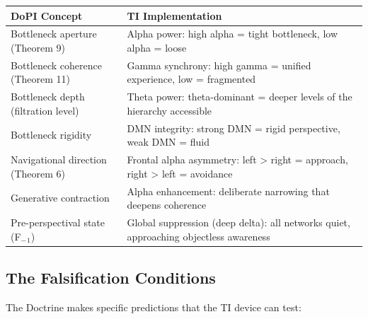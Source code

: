 \begin{longtable}{p{} p{}}
\toprule
\textbf{DoPI Concept} & \textbf{TI Implementation} \\
\midrule
\endhead
Bottleneck aperture (Theorem 9) & Alpha power: high alpha = tight bottleneck, low alpha = loose \\
Bottleneck coherence (Theorem 11) & Gamma synchrony: high gamma = unified experience, low = fragmented \\
Bottleneck depth (filtration level) & Theta power: theta-dominant = deeper levels of the hierarchy accessible \\
Bottleneck rigidity & DMN integrity: strong DMN = rigid perspective, weak DMN = fluid \\
Navigational direction (Theorem 6) & Frontal alpha asymmetry: left > right = approach, right > left = avoidance \\
Generative contraction & Alpha enhancement: deliberate narrowing that deepens coherence \\
Pre-perspectival state (F$_{-}$$_1$) & Global suppression (deep delta): all networks quiet, approaching objectless awareness \\
\bottomrule
\end{longtable}



\subsection*{The Falsification Conditions}


The Doctrine makes specific predictions that the TI device can test:


